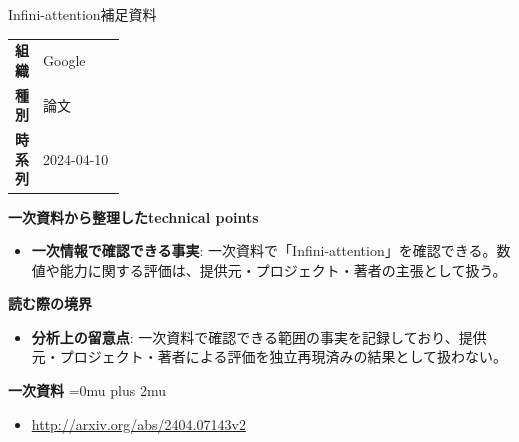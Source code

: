 \begin{technicalnote}{Infini-attention}{補足資料}
\begingroup
\begin{tabularx}{\linewidth}{@{}>{\bfseries}p{0.22\linewidth}X@{}}
組織 & Google \\
種別 & 論文 \\
時系列 & 2024-04-10 \\
\end{tabularx}
\smallskip
{\bfseries 一次資料から整理したtechnical points}
\begin{itemize}[leftmargin=1.5em,itemsep=0.35em]
\item \textbf{一次情報で確認できる事実}: 一次資料で「Infini-attention」を確認できる。数値や能力に関する評価は、提供元・プロジェクト・著者の主張として扱う。
\end{itemize}
\begin{minipage}{\linewidth}
{\bfseries 読む際の境界}
\begin{itemize}[leftmargin=1.5em,itemsep=0.35em]
\item \textbf{分析上の留意点}: 一次資料で確認できる範囲の事実を記録しており、提供元・プロジェクト・著者による評価を独立再現済みの結果として扱わない。
\end{itemize}
\begin{samepage}
{\bfseries 一次資料}
\begingroup\sloppy
\Urlmuskip=0mu plus 2mu\relax
\begin{itemize}[leftmargin=1.5em,itemsep=0.25em]
\item {\scriptsize\url{http://arxiv.org/abs/2404.07143v2}}
\end{itemize}
\endgroup
\end{samepage}
\end{minipage}
\endgroup
\end{technicalnote}
\medskip

